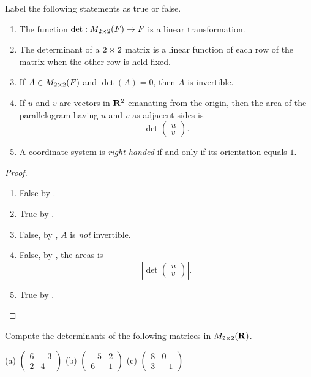 \exercisesection

\begin{exercise} \label{exercise 4.1.1}
Label the following statements as true or false.
\begin{enumerate}
\item The function \(\det : M_{2 \times 2}(F) \to F\) is a linear transformation.
\item The determinant of a \(2 \times 2\) matrix is a linear function of each row of the matrix when the other row is held fixed.
\item If \(A \in M_{2 \times 2}(F)\) and \(\det(A) = 0\), then \(A\) is invertible.
\item If \(u\) and \(v\) are vectors in \(\mathbf{R}^2\) emanating from the origin, then the area of the parallelogram having \(u\) and \(v\) as adjacent sides is
\[
    \det \begin{pmatrix} u \\ v \end{pmatrix}.
\]
\item A coordinate system is \emph{right-handed} if and only if its orientation equals \(1\).
\end{enumerate}
\end{exercise}

\begin{proof} \ 

\begin{enumerate}
\item False by .
\item True by .
\item False, by , \(A\) is \emph{not} invertible.
\item False, by , the areas is
\[
    \left| \det \begin{pmatrix} u \\ v \end{pmatrix} \right|.
\]
\item True by .
\end{enumerate}
\end{proof}

\begin{exercise} \label{exercise 4.1.2}
Compute the determinants of the following matrices in  \(M_{2 \times 2}(\mathbf{R})\).

(a) \(\left(\begin{array}{rr} 6 & -3 \\ 2 & 4 \end{array}\right)\)
(b) \(\left(\begin{array}{rr} -5 & 2 \\ 6 & 1 \end{array}\right)\)
(c) \(\left(\begin{array}{rr} 8 & 0 \\ 3 & -1 \end{array}\right)\)
\end{exercise}

